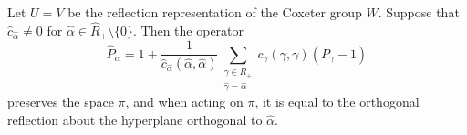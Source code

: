 \documentclass[10pt,a4paper]{amsart}
\begin{document}
\begin{prop} \label{projref}
Let $U = V$ be the reflection representation of the Coxeter group $W$. 
Suppose that $\widehat{c}_{\widehat{\alpha}} \neq 0$ for  $\widehat{\alpha} \in \widehat{R}_+ \setminus \{0\}$. Then the operator
\begin{equation}
    \widehat{P}_{\widehat{\alpha}} = 1 + \frac{1}{\widehat{c}_{\widehat{\alpha}} (\widehat{\alpha}, \widehat{\alpha})} \sum_{\substack{ \gamma \in R_+ \\\widehat{\gamma} = \widehat{\alpha}}} 
    c_{\gamma}(\gamma, \gamma) (P_{\gamma} - 1)  \label{P hat}
\end{equation}
preserves
the space $\pi$, and when acting on $\pi$, it is equal to the orthogonal reflection 
about the hyperplane orthogonal to $\widehat{\alpha}$.
\end{prop}
\end{document}
